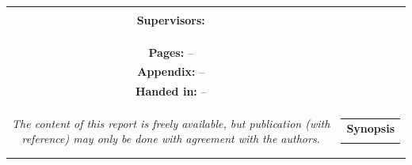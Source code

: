 \begin{titlepage}
\begin{nopagebreak}
{\begin{tabular}{cc}
{{\textbf{Participants:}\\




\textbf{Supervisors:}\\

}\\
\\
\\
\textbf{Pages:} --\\
\textbf{Appendix:} -- \\
\textbf{Handed in:} --\\
\\
\textit{The content of this report is freely available, but publication (with reference) may only be done with
	agreement with the authors.}
\vfill } &
\parbox{7cm}{
  \vspace{.15cm}
  \hfill
  \begin{tabular}{l}
  {\textbf{Synopsis}}\bigskip \\
  \fbox{
    \parbox{6.5cm}{\bigskip
     {\vfill{\small 
     \bigskip}}
     }}
   \end{tabular}}
\end{tabular}} %



\end{nopagebreak}
\end{titlepage}
%